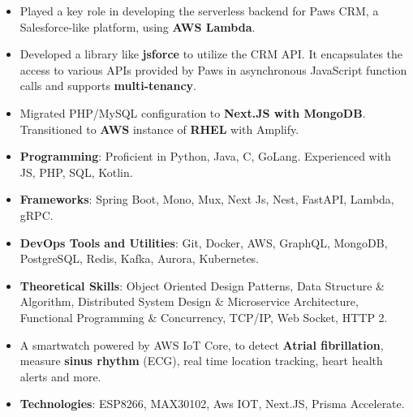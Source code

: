 


\begin{itemize}[itemsep=6pt]
\normalsize

\item Played a key role in developing the serverless backend for Paws CRM, a Salesforce-like platform, using \textbf{AWS Lambda}. 

\item Developed a library like \textbf{jsforce} to utilize the CRM API. It encapsulates the access to various APIs provided by Paws in asynchronous JavaScript function calls and supports \textbf{multi-tenancy}.

\end{itemize}
\vspace{6pt}

\begin{itemize}[itemsep=6pt]
\normalsize
\item Migrated PHP/MySQL configuration to \textbf{Next.JS with MongoDB}. Transitioned to \textbf{AWS} instance of \textbf{RHEL} with Amplify.
\end{itemize}


\smallskip
\begin{itemize}
\normalsize
\item \textbf{Programming}: Proficient in Python, Java, C, GoLang. Experienced with JS, PHP, SQL, Kotlin.
\smallskip
\item \textbf{Frameworks}: Spring Boot, Mono, Mux, Next Js, Nest, FastAPI, Lambda, gRPC.
\smallskip
\item \textbf{DevOps Tools and Utilities}: Git, Docker, AWS, GraphQL, MongoDB, PostgreSQL, Redis, Kafka, Aurora, Kubernetes.
\smallskip
\item \textbf{Theoretical Skills}: Object Oriented Design Patterns, Data Structure \& Algorithm, Distributed System Design \& Microservice Architecture, Functional Programming \& Concurrency, TCP/IP, Web Socket, HTTP 2.
\smallskip
\end{itemize}


\begin{itemize}
\normalsize

\item A smartwatch powered by AWS IoT Core, to detect \textbf{Atrial fibrillation}, measure \textbf{sinus rhythm} (ECG), real time location tracking, heart health alerts and more.

\item \textbf{Technologies}: ESP8266, MAX30102, Aws IOT, Next.JS, Prisma Accelerate.\\


\end{itemize}
\smallskip
\smallskip

